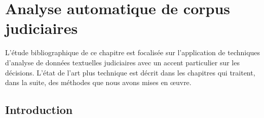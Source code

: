 \chapter{Analyse automatique de corpus judiciaires}
\label{chap:literature}


L'étude bibliographique de ce chapitre est focalisée sur l'application de techniques d'analyse de données textuelles judiciaires avec un accent particulier sur les décisions. L'état de l'art plus technique est décrit dans les chapitres qui traitent, dans la suite, des méthodes que nous avons mises en \oe{}uvre.

\section{Introduction}

